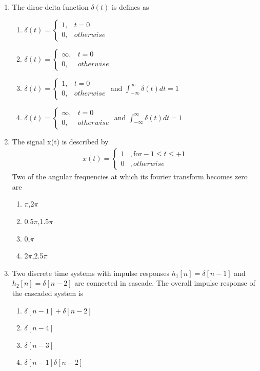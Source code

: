 \begin{enumerate}[label=\arabic*.,ref=\theenumi]
\item The dirac-delta function $\delta(t)$ is defines as 
\begin{enumerate}
    \item $\delta(t)=  \begin{cases}
 1 , & t=0\\
 0, & otherwise
 \end{cases}$
  \item $\delta(t)=  \begin{cases}
 \infty , & t=0\\
 0, & otherwise
 \end{cases}$
  \item $\delta(t)=  \begin{cases}
 1 , & t=0\\
 0, & otherwise
 \end{cases}$ and $\int_{-\infty}^{\infty} \delta(t)dt =1$
  \item $\delta(t)=  \begin{cases}
\infty , & t=0\\
 0, & otherwise
 \end{cases}$ and $\int_{-\infty}^{\infty} \delta(t)dt =1$
\end{enumerate}
\solution

\item The signal x(t) is described by 
\begin{align}
 x(t)=
\begin{cases}
1 & ,\text{for} -1 \leq t \leq +1\\
0 & ,otherwise
\end{cases} 
\end{align}
Two of the angular frequencies at which its fourier transform becomes zero are 
\begin{enumerate}
\item\label{1} $\pi$,2$\pi$
\item 0.5$\pi$,1.5$\pi$
\item 0,$\pi$
\item 2$\pi$,2.5$\pi$
\end{enumerate}
\solution

\item Two discrete time systems with impulse responses $h_1[n]=\delta[n-1]$ and $h_2[n]=\delta[n-2]$ are connected in cascade. The overall impulse response of the cascaded system is
\begin{enumerate}
    \item $\delta[n-1]+\delta[n-2]$
    \item $\delta[n-4]$
    \item $\delta[n-3]$
    \item $\delta[n-1]\delta[n-2]$
\end{enumerate}
\solution




\end{enumerate}
